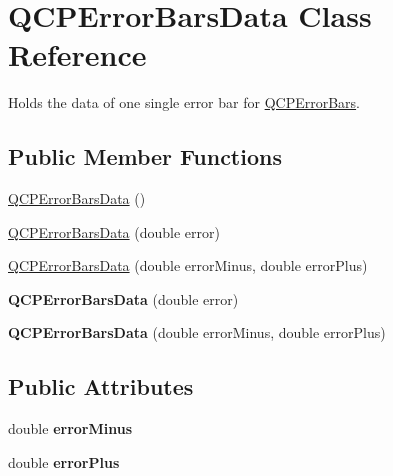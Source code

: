 \hypertarget{class_q_c_p_error_bars_data}{}\section{Q\+C\+P\+Error\+Bars\+Data Class Reference}
\label{class_q_c_p_error_bars_data}


Holds the data of one single error bar for \hyperlink{class_q_c_p_error_bars}{Q\+C\+P\+Error\+Bars}.  


\subsection*{Public Member Functions}
\begin{DoxyCompactItemize}
\item 
\hyperlink{class_q_c_p_error_bars_data_ac18bdb46dec56f8df7f3c99d058cc725}{Q\+C\+P\+Error\+Bars\+Data} ()
\item 
\hyperlink{class_q_c_p_error_bars_data_a73ebdaa55fa7f0052b70895b28edb444}{Q\+C\+P\+Error\+Bars\+Data} (double error)
\item 
\hyperlink{class_q_c_p_error_bars_data_a7c61e42d87aea3312262d5429bc28387}{Q\+C\+P\+Error\+Bars\+Data} (double error\+Minus, double error\+Plus)
\item 
{\bfseries Q\+C\+P\+Error\+Bars\+Data} (double error)\hypertarget{class_q_c_p_error_bars_data_a73ebdaa55fa7f0052b70895b28edb444}{}\label{class_q_c_p_error_bars_data_a73ebdaa55fa7f0052b70895b28edb444}

\item 
{\bfseries Q\+C\+P\+Error\+Bars\+Data} (double error\+Minus, double error\+Plus)\hypertarget{class_q_c_p_error_bars_data_a7c61e42d87aea3312262d5429bc28387}{}\label{class_q_c_p_error_bars_data_a7c61e42d87aea3312262d5429bc28387}

\end{DoxyCompactItemize}
\subsection*{Public Attributes}
\begin{DoxyCompactItemize}
\item 
double {\bfseries error\+Minus}\hypertarget{class_q_c_p_error_bars_data_af8aaea160e52c14c57836224ee78020b}{}\label{class_q_c_p_error_bars_data_af8aaea160e52c14c57836224ee78020b}

\item 
double {\bfseries error\+Plus}\hypertarget{class_q_c_p_error_bars_data_ad1283c99fbfccf37a0226b1df52f0776}{}\label{class_q_c_p_error_bars_data_ad1283c99fbfccf37a0226b1df52f0776}

\end{DoxyCompactItemize}


